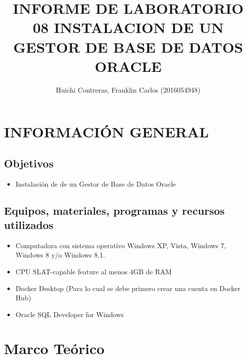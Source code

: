 \documentclass[preprint,12pt]{elsarticle}
\begin{document}
	
	\begin{frontmatter} 

		\title{\huge INFORME DE LABORATORIO 08 INSTALACION DE UN GESTOR DE BASE DE DATOS ORACLE}
		
		\author{Huichi Contreras, Franklin Carlos         	(2016054948)} 
		\address{Escuela Profesional de Ingeniería de Sistemas}
		\address{Universidad Privada de Tacna}
		\address{Tacna, Perú}
		

	\end{frontmatter}


\section{INFORMACIÓN GENERAL} 

\subsection {\textbf{Objetivos}}
\begin{itemize}
	\item Instalación de de un Gestor de Base de Datos Oracle
\end{itemize}

\subsection {\textbf{Equipos, materiales, programas y recursos utilizados}}
\begin{itemize}
	\item Computadora con sistema operativo Windows XP, Vista, Windows 7, Windows 8 y/o Windows 8.1.
	\item CPU SLAT-capable feature al menos 4GB de RAM
	\item Docker Desktop (Para lo cual se debe primero crear una cuenta en Docker Hub)
	\item Oracle SQL Developer for Windows 
\end{itemize}




\section{Marco Teórico}
\end{document}
